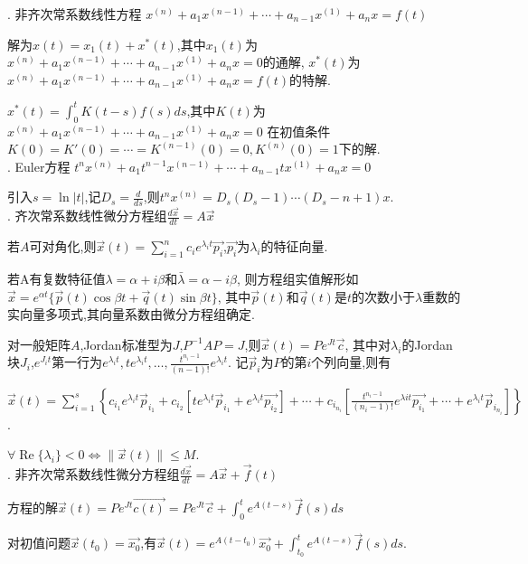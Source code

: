 \documentclass[UTF8]{ctexart}
\begin{document}
. 非齐次常系数线性方程
$x^{(n)}+a_1x^{(n-1)}+\cdots +a_{n-1}x^{(1)}+a_nx=f(t)$ \par
解为$x(t)=x_1(t)+x^*(t)$,其中$x_1(t)$为$x^{(n)}+a_1x^{(n-1)}+\cdots +a_{n-1}x^{(1)}+a_nx=0$的通解,
$x^*(t)$为$x^{(n)}+a_1x^{(n-1)}+\cdots +a_{n-1}x^{(1)}+a_nx=f(t)$的特解. \par
$x^*(t)=\int _0^t K(t-s)f(s)ds$,其中$K(t)$为$x^{(n)}+a_1x^{(n-1)}+\cdots +a_{n-1}x^{(1)}+a_nx=0$
在初值条件$K(0)=K'(0)=\cdots =K^{(n-1)}(0)=0, K^{(n)}(0)=1$下的解.
~\\

. Euler方程
$t^nx^{(n)}+a_1t^{n-1}x^{(n-1)}+\cdots +a_{n-1}tx^{(1)}+a_nx=0$ \par
引入$s=\ln |t|$,记$D_s=\frac{d}{ds}$,则$t^n x^{(n)}=D_s(D_s-1)\cdots (D_s-n+1)x$.
~\\

. 齐次常系数线性微分方程组$\frac{d\vec{x}}{dt}=A\vec{x} $ \par

若$A$可对角化,则$\vec{x}(t)=\sum _{i=1}^n c_i e^{\lambda_i t}\vec{p_i}$,$\vec{p_i}$为$\lambda_i$的特征向量. \par
若A有复数特征值$\lambda=\alpha+i\beta$和$\bar{\lambda}=\alpha-i\beta$,
则方程组实值解形如$\vec{x}=e^{\alpha t}\{\vec{p}(t) \cos \beta t+\vec{q}(t) \sin \beta t\}$,
其中$\vec{p}(t)$和$\vec{q}(t)$是$t$的次数小于$\lambda$重数的实向量多项式,其向量系数由微分方程组确定. \par

对一般矩阵$A$,Jordan标准型为$J$,$P^{-1}AP=J$,则$\vec{x}(t)=Pe^{Jt}\vec{c}$,
其中对$\lambda_i$的Jordan块$J_i$,$e^{J_it}$第一行为$e^{\lambda_it},te^{\lambda_it},\dots ,\frac{t^{n_i-1}}{(n-1)!}e^{\lambda_it}$.
记$\vec{p}_i$为$P$的第$i$个列向量,则有 \par
$\vec{x}(t)= \sum_{i=1}^{s}\left\{c_{i_1}e^{\lambda_it} \vec{p}_{i_1}+c_{i_2}\left[te^{\lambda_it} \vec{p}_{i_1}+e^{\lambda_it}\vec{p_{i_2}}\right]
	+\cdots+c_{i_{n_{i}}}\left[\frac{t^{n_{i}-1}}{\left(n_{i}-1\right)!} e^{\lambda i t} \vec{p_{i_1}}+\cdots+e^{\lambda_it} \vec{p}_{i_{n_{i}}}\right]\right\}$.\par
$\forall \operatorname{Re}\{\lambda_i\}<0 \Leftrightarrow \|\vec{x}(t)\| \leq M$.
~\\

. 非齐次常系数线性微分方程组$\frac{d\vec{x}}{dt}=A\vec{x} +\vec{f}(t)$ \par
方程的解$\vec{x}(t)=Pe^{Jt}\vec{c(t)}=Pe^{Jt}\vec{c}+\int_{0}^te^{A(t-s)}\vec{f}(s)ds$ \par
对初值问题$\vec{x}(t_0)=\vec{x_0}$,有$\vec{x}(t)=e^{A(t-t_0)}\vec{x_0}+\int_{t_0}^te^{A(t-s)}\vec{f}(s)ds$.
~\\
\end{document}

